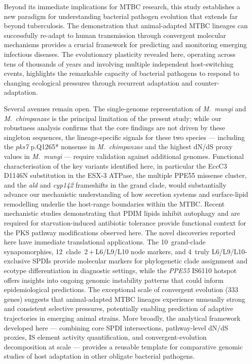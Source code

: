\documentclass[11pt,a4paper]{article}
\newcommand{\Mmun}{\textit{M.~mungi}}
\newcommand{\Mchi}{\textit{M.~chimpanzae}}
\begin{document}
Beyond its immediate implications for MTBC research, this study establishes
a new paradigm for understanding bacterial pathogen evolution that extends
far beyond tuberculosis. The demonstration that animal-adapted MTBC lineages can
successfully re-adapt to human transmission through convergent molecular
mechanisms provides a crucial framework for predicting and monitoring emerging
infectious diseases. The evolutionary plasticity revealed here, operating
across tens of thousands of years and involving multiple independent host-switching
events, highlights the remarkable capacity of bacterial pathogens to respond
to changing ecological pressures through recurrent adaptation and counter-adaptation.

Several avenues remain open.
%
The single-genome representation of \Mmun{} and \Mchi{} is the principal
limitation of the present study; while our robustness analysis confirms that
the core findings are not driven by these singleton sequences, the
lineage-specific signals for these two species --- including the \textit{pks7}
p.Q1265* nonsense in \Mchi{} and the highest dN/dS proxy values in \Mmun{}
--- require validation against additional genomes.
%
Functional characterisation of the key variants identified here, in particular
the EccC3 D1146N substitution in the ESX-3 ATPase, the multiple PPE55 missense
cluster, and the \textit{ald} and \textit{cyp142} frameshifts in the grand
clade, would substantially
advance our mechanistic understanding of how secretion systems and
surface-lipid remodelling underlie the host-range boundaries within the MTBC.
Recent mechanistic studies demonstrating that PDIM lipids inhibit autophagy
\cite{Mittal2024} and are required for starvation-induced antibiotic tolerance
\cite{Block2023} provide functional context for the PKS pathway modifications
observed here.
%
The novel discoveries reported here have immediate translational applications.
The 10~grand-clade synapomorphies, 12~clade~2\,+\,L6/L9/L10 node markers,
and 4~truly L6/L9/L10-exclusive SPDIs provide molecular markers for
phylogenetic clade assignment and ecotype differentiation in diagnostic
settings, while the \textit{PPE55} IS6110
hotspot offers insights into ongoing genomic instability patterns that could
inform epidemiological predictions. The exceptional scale of
convergent evolution (333 genes) suggests that animal-adapted MTBC lineages
experience unusually strong and consistent selective pressures, potentially
enabling prediction of adaptive trajectories in emerging animal strains.
%
More broadly, the analytical framework developed here --- combining core SPDI
intersections, pathway-level dN/dS proxies, IS element activity quantification,
and convergent-evolution decomposition at scale --- provides a reusable template for comparative
genomic studies of host adaptation in other obligate bacterial pathogens.
\end{document}
